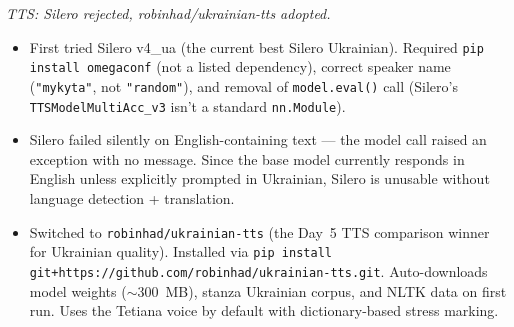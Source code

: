 \documentclass{article}
\theoremstyle{plain}
\theoremstyle{definition}
\theoremstyle{remark}
\begin{document}
\textit{TTS: Silero rejected, robinhad/ukrainian-tts adopted.}
\begin{itemize}
\item First tried Silero v4\_ua (the current best Silero Ukrainian). Required \texttt{pip install omegaconf} (not a listed dependency), correct speaker name (\texttt{"mykyta"}, not \texttt{"random"}), and removal of \texttt{model.eval()} call (Silero's \texttt{TTSModelMultiAcc\_v3} isn't a standard \texttt{nn.Module}).
\item Silero failed silently on English-containing text --- the model call raised an exception with no message. Since the base model currently responds in English unless explicitly prompted in Ukrainian, Silero is unusable without language detection + translation.
\item Switched to \texttt{robinhad/ukrainian-tts} (the Day~5 TTS comparison winner for Ukrainian quality). Installed via \texttt{pip install git+https://github.com/robinhad/ukrainian-tts.git}. Auto-downloads model weights ($\sim$300~MB), stanza Ukrainian corpus, and NLTK data on first run. Uses the Tetiana voice by default with dictionary-based stress marking.
\end{itemize}
\end{document}
